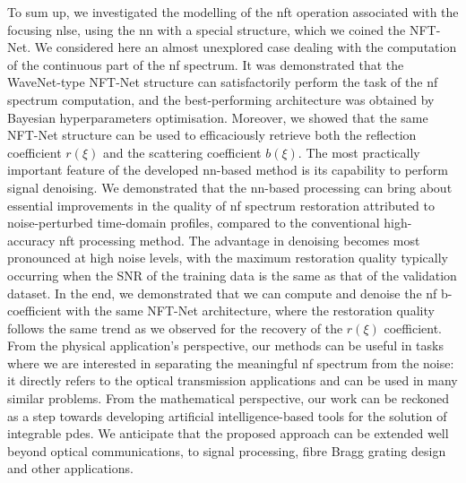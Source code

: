 To sum up, we investigated the modelling of the \acrshort{nft} operation associated with the focusing \acrshort{nlse}, using the \acrshort{nn} with a special structure, which we coined the NFT-Net. We considered here an almost unexplored case dealing with the computation of the continuous part of the \acrshort{nf} spectrum. It was demonstrated that the WaveNet-type NFT-Net structure can satisfactorily perform the task of the \acrshort{nf} spectrum computation, and the best-performing architecture was obtained by Bayesian hyperparameters optimisation. Moreover, we showed that the same NFT-Net structure can be used to efficaciously retrieve both the reflection coefficient $r(\xi)$ and the scattering coefficient $b(\xi)$. The most practically important feature of the developed \acrshort{nn}-based method is its capability to perform signal denoising.  We demonstrated that the \acrshort{nn}-based processing can bring about essential improvements in the quality of \acrshort{nf} spectrum restoration attributed to noise-perturbed time-domain profiles, compared to the conventional high-accuracy \acrshort{nft} processing method. The advantage in denoising becomes most pronounced at high noise levels, with the maximum restoration quality typically occurring when the SNR of the training data is the same as that of the validation dataset. 
In the end, we demonstrated that we can compute and denoise the \acrshort{nf} b-coefficient with the same NFT-Net architecture, where the restoration quality follows the same trend as we observed for the recovery of the $r(\xi)$ coefficient. From the physical application's perspective, our methods can be useful in tasks where we are interested in separating the meaningful \acrshort{nf} spectrum from the noise: it directly refers to the optical transmission applications and can be used in many similar problems. From the mathematical perspective, our work can be reckoned as a step towards developing artificial intelligence-based tools for the solution of integrable \acrshort{pde}s. We anticipate that the proposed approach can be extended well beyond optical communications, to signal processing, fibre Bragg grating design \cite{FBG01,FBG02} and other applications.

